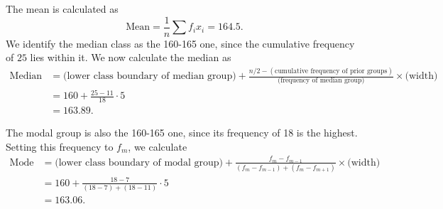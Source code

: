 \documentclass[10pt]{article}
\begin{document}
        The mean is calculated as
        \[
                \text{Mean} = \frac{1}{n}\sum f_i x_i = 164.5.
        \]
        We identify the median class as the 160-165 one, since the cumulative frequency of $25$ lies within it. We now calculate the
        median as
        \begin{align*}
                \text{Median} &= \text{(lower class boundary of median group)} 
                        + \frac{n/2 - (\text{cumulative frequency of prior groups})}{\text{(frequency of median group)}}\times
                        \text{(width)}  \\
                        &= 160 + \frac{25 - 11}{18}\cdot 5 \\
                        &= 163.89.
        \end{align*}

        The modal group is also the 160-165 one, since its frequency of 18 is the highest. Setting this frequency to $f_m$, we calculate
        \begin{align*}
                \text{Mode} &= \text{(lower class boundary of modal group)} + \frac{f_m - f_{m - 1}}{(f_m - f_{m - 1}) + (f_m - f_{m + 1})} 
                        \times\text{(width)} \\
                        &= 160 + \frac{18 - 7}{(18 - 7) + (18 - 11)}\cdot 5 \\
                        &= 163.06.
        \end{align*}
\end{document}
